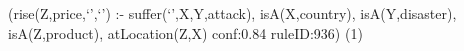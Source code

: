 (rise(Z,price,`',`') :- suffer(`',X,Y,attack), isA(X,country), isA(Y,disaster), isA(Z,product), atLocation(Z,X) conf:0.84 ruleID:936) (1)







	
